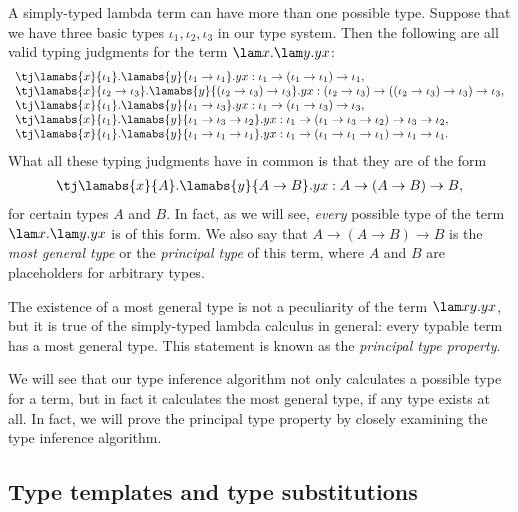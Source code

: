 \documentclass[12pt]{article}
\begin{document}
A simply-typed lambda term can have more than one possible type.
Suppose that we have three basic types $\iota_1,\iota_2,\iota_3$ in
our type system. Then the following are all valid typing judgments for
the term $\lam x.\lam y.yx$:
\[ \begin{array}{l}
  \tj \lamabs{x}{\iota_1}.\lamabs{y}{\iota_1\to\iota_1}.yx : 
  \iota_1\to(\iota_1\to\iota_1)\to\iota_1, \\
  \tj \lamabs{x}{\iota_2\to\iota_3}.\lamabs{y}{(\iota_2\to\iota_3)\to\iota_3}.yx : 
  (\iota_2\to\iota_3)\to((\iota_2\to\iota_3)\to\iota_3)\to\iota_3, \\
  \tj \lamabs{x}{\iota_1}.\lamabs{y}{\iota_1\to\iota_3}.yx : 
  \iota_1\to(\iota_1\to\iota_3)\to\iota_3, \\
  \tj \lamabs{x}{\iota_1}.\lamabs{y}{\iota_1\to\iota_3\to\iota_2}.yx : 
  \iota_1\to(\iota_1\to\iota_3\to\iota_2)\to\iota_3\to\iota_2, \\
  \tj \lamabs{x}{\iota_1}.\lamabs{y}{\iota_1\to\iota_1\to\iota_1}.yx : 
  \iota_1\to(\iota_1\to\iota_1\to\iota_1)\to\iota_1\to\iota_1.
\end{array}
\]
What all these typing judgments have in common is that they are of the
form
\[ \begin{array}{l}
  \tj \lamabs{x}{A}.\lamabs{y}{A\to B}.yx : A\to(A\to B)\to B,
\end{array}
\]
for certain types $A$ and $B$. In fact, as we will see, {\em every}
possible type of the term $\lam x.\lam y.yx$ is of this form. We also
say that $A\to(A\to B)\to B$ is the {\em most general type} or the
{\em principal type} of this term, where $A$ and $B$ are placeholders
for arbitrary types.

The existence of a most general type is not a peculiarity of the term
$\lam xy.yx$, but it is true of the simply-typed lambda calculus in
general: every typable term has a most general type. This statement
is known as the {\em principal type property}. 

We will see that our type inference algorithm not only calculates a
possible type for a term, but in fact it calculates the most general
type, if any type exists at all. In fact, we will prove the principal
type property by closely examining the type inference algorithm.

\subsection{Type templates and type substitutions}
\end{document}
